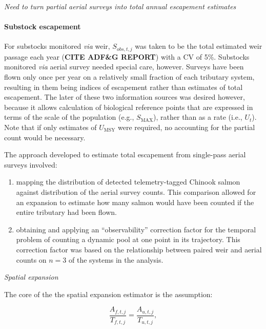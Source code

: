 \documentclass[12pt,]{book}
\let\oldparagraph\paragraph
\renewcommand{\paragraph}[1]{\oldparagraph{#1}\mbox{}}
\theoremstyle{definition}
\theoremstyle{definition}
\theoremstyle{definition}
\theoremstyle{remark}
\begin{document}
\emph{Need to turn partial aerial surveys into total annual escapement
estimates}

\paragraph{Substock escapement}\label{substock-escapement}

\noindent
For substocks monitored \emph{via} weir, \(S_{obs,t,j}\) was taken to be
the total estimated weir passage each year (\textbf{CITE ADF\&G REPORT})
with a CV of 5\%. Substocks monitored \emph{via} aerial survey needed
special care, however. Surveys have been flown only once per year on a
relatively small fraction of each tributary system, resulting in them
being indices of escapement rather than estimates of total escapement.
The later of these two information sources was desired however, because
it allows calculation of biological reference points that are expressed
in terms of the scale of the population (e.g., \(S_{\text{MAX}}\)),
rather than as a rate (i.e., \(U_t\)). Note that if only estimates of
\(U_{\text{MSY}}\) were required, no accounting for the partial count
would be necessary.

The approach developed to estimate total escapement from single-pass
aerial surveys involved:

\begin{enumerate}
\def\labelenumi{(\alph{enumi})}
\item
  mapping the distribution of detected telemetry-tagged Chinook salmon
  against distribution of the aerial survey counts. This comparison
  allowed for an expansion to estimate how many salmon would have been
  counted if the entire tributary had been flown.
\item
  obtaining and applying an ``observability'' correction factor for the
  temporal problem of counting a dynamic pool at one point in its
  trajectory. This correction factor was based on the relationship
  between paired weir and aerial counts on \(n=3\) of the systems in the
  analysis.
\end{enumerate}

\noindent
\emph{Spatial expansion}

\noindent
The core of the the spatial expansion estimator is the assumption:

\begin{equation}
  \frac{A_{f,t,j}}{T_{f,t,j}} = \frac{A_{u,t,j}}{T_{u,t,j}},
  \label{eq:air-expand1}
\end{equation}
\end{document}
